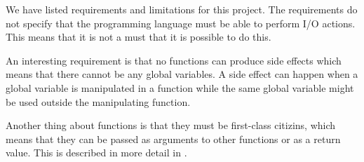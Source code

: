 We have listed requirements and limitations for this project. The requirements do not specify that the programming language must be able to perform I/O actions. This means that it is not a must that it is possible to do this.

An interesting requirement is that no functions can produce side effects which means that there cannot be any global variables. A side effect can happen when a global variable is manipulated in a function while the same global variable might be used outside the manipulating function. 

Another thing about functions is that they must be first-class citizins, which means that they can be passed as arguments to other functions or as a return value. This is described in more detail in .

